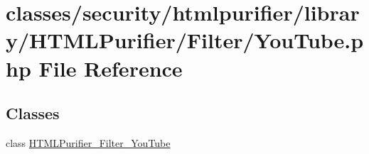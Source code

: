 \hypertarget{YouTube_8php}{\section{classes/security/htmlpurifier/library/\+H\+T\+M\+L\+Purifier/\+Filter/\+You\+Tube.php File Reference}
\label{YouTube_8php}
}
\subsection*{Classes}
\begin{DoxyCompactItemize}
\item 
class \hyperlink{classHTMLPurifier__Filter__YouTube}{H\+T\+M\+L\+Purifier\+\_\+\+Filter\+\_\+\+You\+Tube}
\end{DoxyCompactItemize}
